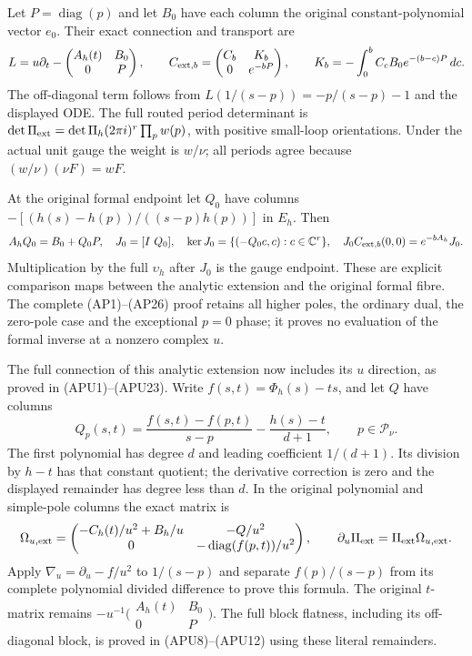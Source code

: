 Let $P=\operatorname{diag}(p)$ and let $B_0$ have each column
the original constant-polynomial vector $e_0$. Their exact
connection and transport are
\[
L=u\partial_t-
\begin{pmatrix}A_h(t)&B_0\\0&P\end{pmatrix},\qquad
C_{{\rm ext},b}=
\begin{pmatrix}C_b&K_b\\0&e^{-bP}\end{pmatrix},\qquad
K_b=-\int_0^bC_cB_0e^{-(b-c)P}\,dc.
\]
The off-diagonal term follows from
$L(1/(s-p))=-p/(s-p)-1$ and the displayed ODE. The full
routed period determinant is
$\det\Pi_{\rm ext}=\det\Pi_h(2\pi i)^r\prod_pw(p)$,
with positive small-loop orientations. Under the actual
unit gauge the weight is $w/\nu$; all periods agree
because $(w/\nu)(\nu F)=wF$.

At the original formal endpoint let $Q_0$ have columns
$-[(h(s)-h(p))/((s-p)h(p))]$ in $E_h$. Then
\[
A_hQ_0=B_0+Q_0P,\quad J_0=[I\ Q_0],\quad
\ker J_0=\{(-Q_0c,c):c\in\mathbb C^r\},\quad
J_0C_{{\rm ext},b}(0,0)=e^{-bA_h}J_0.
\]
Multiplication by the full $\upsilon_h$ after $J_0$ is the
gauge endpoint. These are explicit comparison maps between
the analytic extension and the original formal fibre.
The complete (AP1)--(AP26) proof retains all higher poles,
the ordinary dual, the zero-pole case and the exceptional
$p=0$ phase; it proves no evaluation of the formal inverse
at a nonzero complex $u$.

The full connection of this analytic extension now includes its
\(u\) direction, as proved in (APU1)--(APU23). Write
\(f(s,t)=\Phi_h(s)-ts\), and let \(Q\) have columns
\[
 Q_p(s,t)=\frac{f(s,t)-f(p,t)}{s-p}
              -\frac{h(s)-t}{d+1},\qquad p\in\mathcal P_\nu.
\]
The first polynomial has degree \(d\) and leading coefficient
\(1/(d+1)\). Its division by \(h-t\) has that constant quotient;
the derivative correction is zero and the displayed remainder
has degree less than \(d\). In the original polynomial and
simple-pole columns the exact matrix is
\[
 \Omega_{u,\rm ext}=
 \begin{pmatrix}
 -C_h(t)/u^2+B_h/u&-Q/u^2\\
 0&-\operatorname{diag}(f(p,t))/u^2
 \end{pmatrix},\qquad
 \partial_u\Pi_{\rm ext}=\Pi_{\rm ext}\Omega_{u,\rm ext}.
\]
Apply \(\nabla_u=\partial_u-f/u^2\) to \(1/(s-p)\) and
separate \(f(p)/(s-p)\) from its complete polynomial divided
difference to prove this formula. The original \(t\)-matrix
remains
\(-u^{-1}\bigl(\begin{smallmatrix}A_h(t)&B_0\\0&P\end{smallmatrix}\bigr)\).
The full block flatness, including its off-diagonal block, is
proved in (APU8)--(APU12) using these literal remainders.

